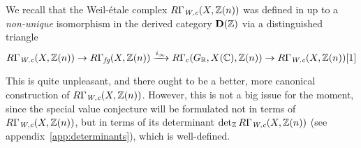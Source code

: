 \documentclass{article}
\numberwithin{equation}{section}
\begin{document}
We recall that the Weil-étale complex $R\Gamma_{\text{\it W,c}} (X, \mathbb{Z}(n))$ was defined in
\cite{Beshenov-Weil-etale-1} up to a \emph{non-unique} isomorphism in the
derived category $\mathbf{D} (\mathbb{Z})$ via a distinguished triangle
\begin{equation}
  \label{eqn:triangle-defining-RGamma-Wc}
  R\Gamma_{\text{\it W,c}} (X, \mathbb{Z}(n)) \to R\Gamma_{\text{\it fg}} (X,\mathbb{Z}(n)) \xrightarrow{i_\infty}
  R\Gamma_c (G_{\mathbb{R}}, X (\mathbb{C}), \mathbb{Z} (n)) \to R\Gamma_{\text{\it W,c}} (X, \mathbb{Z} (n)) [1]
\end{equation}

This is quite unpleasant, and there ought to be a better, more canonical
construction of $R\Gamma_{\text{\it W,c}} (X, \mathbb{Z}(n))$. However, this is not a big issue for
the moment, since the special value conjecture will be formulated not in terms
of $R\Gamma_{\text{\it W,c}} (X, \mathbb{Z} (n))$, but in terms of its determinant
$\operatorname{det}_{\mathbb{Z}} R\Gamma_{\text{\it W,c}} (X, \mathbb{Z}(n))$ (see appendix~\ref{app:determinants}), which
is well-defined.
\end{document}

